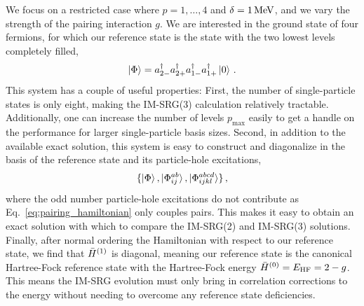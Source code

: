 We focus on a restricted case where $p=1,\ldots,4$ and $\delta=1\, \text{MeV}$,
and we vary the strength of the pairing interaction $g$.
We are interested in the ground state of four fermions,
for which our reference state is the state with the two lowest levels completely filled,
\begin{equation}\label{eq:pairing_hamiltonian_reference}
  \ket{\Phi} = a_{2-}^{\dagger}a_{2+}^{\dagger}a_{1-}^{\dagger}a_{1+}^{\dagger}\ket{0}\,.
\end{equation}
This system has a couple of useful properties:
First, the number of single-particle states is only eight,
making the IM-SRG(3) calculation relatively tractable.
Additionally, one can increase the number of levels $p_{\text{max}}$ easily
to get a handle on the performance for larger single-particle basis sizes.
Second, in addition to the available exact solution,
this system is easy to construct and diagonalize in the basis
of the reference state and its particle-hole excitations,
\begin{equation}
  \{\ket{\Phi}, \ket{\Phi_{ij}^{ab}}, \ket{\Phi_{ijkl}^{abcd}} \}\,,
\end{equation}
where the odd number particle-hole excitations do not contribute
as Eq.~\ref{eq:pairing_hamiltonian} only couples pairs.
This makes it easy to obtain an exact solution with which to compare the IM-SRG(2)
and IM-SRG(3) solutions.
Finally, after normal ordering the Hamiltonian with respect to our reference state,
we find that ${\bar{H}}^{(1)}$ is diagonal,
meaning our reference state is the canonical Hartree-Fock reference state
with the Hartree-Fock energy ${\bar{H}}^{(0)}=E_{\text{HF}}=2 - g$.
This means the IM-SRG evolution must only bring in correlation corrections to the energy
without needing to overcome any reference state deficiencies.

